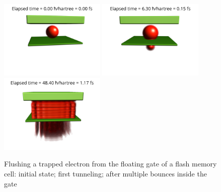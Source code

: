 \begin{figure}[hbt!]
	\begin{center}
		\includegraphics[width=0.45\textwidth]{figures/flash_memory_01.png}
		\includegraphics[width=0.45\textwidth]{figures/flash_memory_02.png}
		\includegraphics[width=0.45\textwidth]{figures/flash_memory_03.png}
		\caption{Flushing a trapped electron from the floating gate of a flash memory cell: initial state; first tunneling; after multiple bounces inside the gate}
		\label{fig:flash_memory_ray_traced}
	\end{center}
\end{figure}


